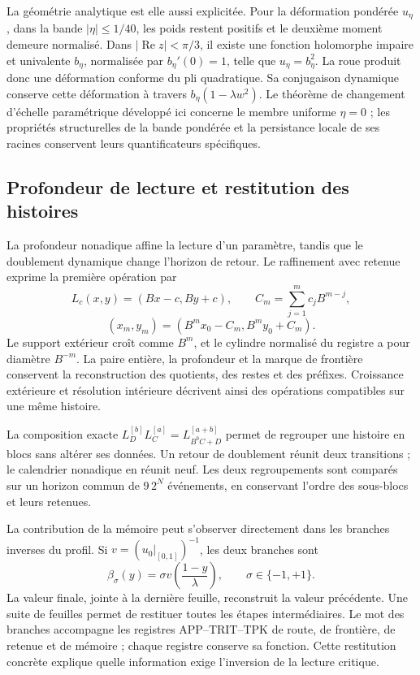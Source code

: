 La géométrie analytique est elle aussi explicitée. Pour la déformation
pondérée \(u_\eta\), dans la bande \(|\eta|\le1/40\), les poids restent
positifs et le deuxième moment demeure normalisé. Dans
\(|\operatorname{Re}z|<\pi/3\), il existe une fonction holomorphe impaire et univalente
\(b_\eta\), normalisée par \(b_\eta'(0)=1\), telle que
\(u_\eta=b_\eta^2\). La roue produit donc une déformation conforme
du pli quadratique. Sa conjugaison dynamique conserve cette déformation
à travers \(b_\eta(1-\lambda w^2)\). Le théorème de changement d’échelle paramétrique
développé ici concerne le membre uniforme \(\eta=0\) ; les
propriétés structurelles de la bande pondérée et la persistance locale de
ses racines conservent leurs quantificateurs spécifiques.

\subsection{Profondeur de lecture et restitution des histoires}

La profondeur nonadique affine la lecture d’un paramètre, tandis que le
doublement dynamique change l’horizon de retour. Le raffinement avec
retenue exprime la première opération par
\[
L_c(x,y)=(Bx-c,By+c),\qquad
C_m=\sum_{j=1}^m c_jB^{m-j},
\]
\[
(x_m,y_m)=(B^mx_0-C_m,B^my_0+C_m).
\]
Le support extérieur croît comme \(B^m\), et le cylindre normalisé du registre
a pour diamètre \(B^{-m}\). La paire entière, la profondeur et la marque de
frontière conservent la reconstruction des quotients, des restes et des préfixes.
Croissance extérieure et résolution intérieure décrivent ainsi des opérations
compatibles sur une même histoire.

La composition exacte
\(L_D^{[b]}L_C^{[a]}=L_{B^bC+D}^{[a+b]}\) permet de regrouper une histoire en
blocs sans altérer ses données. Un retour de doublement réunit deux
transitions ; le calendrier nonadique en réunit neuf. Les deux regroupements sont
comparés sur un horizon commun de \(9\,2^N\) événements, en conservant
l’ordre des sous-blocs et leurs retenues.

La contribution de la mémoire peut s’observer directement dans les branches
inverses du profil. Si \(v=(u_0|_{[0,1]})^{-1}\), les deux branches sont
\[
\beta_\sigma(y)=\sigma v\!\left(\frac{1-y}{\lambda}\right),
\qquad \sigma\in\{-1,+1\}.
\]
La valeur finale, jointe à la dernière feuille, reconstruit la valeur précédente. Une
suite de feuilles permet de restituer toutes les étapes intermédiaires. Le mot
des branches accompagne les registres APP--TRIT--TPK de route, de frontière, de retenue et de
mémoire ; chaque registre conserve sa fonction. Cette restitution concrète
explique quelle information exige l’inversion de la lecture critique.

